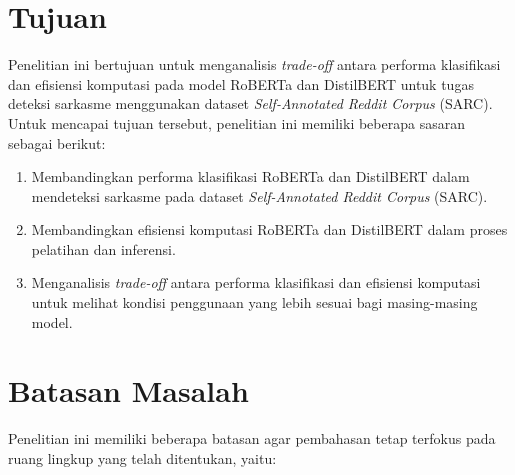\section{Tujuan}

Penelitian ini bertujuan untuk menganalisis \textit{trade-off} antara performa klasifikasi dan efisiensi komputasi pada model RoBERTa dan DistilBERT untuk tugas deteksi sarkasme menggunakan dataset \textit{Self-Annotated Reddit Corpus} (SARC). Untuk mencapai tujuan tersebut, penelitian ini memiliki beberapa sasaran sebagai berikut:

\begin{enumerate}
    \item Membandingkan performa klasifikasi RoBERTa dan DistilBERT dalam mendeteksi sarkasme pada dataset \textit{Self-Annotated Reddit Corpus} (SARC).
    
    \item Membandingkan efisiensi komputasi RoBERTa dan DistilBERT dalam proses pelatihan dan inferensi.
    
    \item Menganalisis \textit{trade-off} antara performa klasifikasi dan efisiensi komputasi untuk melihat kondisi penggunaan yang lebih sesuai bagi masing-masing model.
\end{enumerate}

\section{Batasan Masalah}

Penelitian ini memiliki beberapa batasan agar pembahasan tetap terfokus pada ruang lingkup yang telah ditentukan, yaitu:


